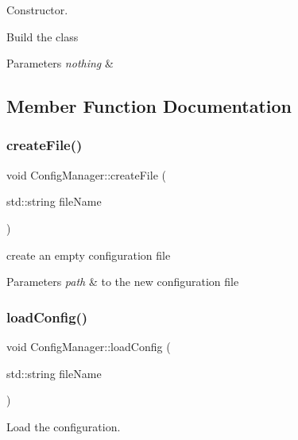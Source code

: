 Constructor. 

Build the class


\begin{DoxyParams}{Parameters}
{\em nothing} & \\
\hline
\end{DoxyParams}


\subsection{Member Function Documentation}
\mbox{\label{classConfigManager_a4f2b06f2ef741a15b3dfe82259cfd355}} 
\subsubsection{\texorpdfstring{create\+File()}{createFile()}}
{\footnotesize\ttfamily void Config\+Manager\+::create\+File (\begin{DoxyParamCaption}\item[{std\+::string}]{file\+Name }\end{DoxyParamCaption})}



create an empty configuration file 


\begin{DoxyParams}{Parameters}
{\em path} & to the new configuration file \\
\hline
\end{DoxyParams}
\mbox{\label{classConfigManager_a63ff6c831f037cf5bfe580b4944b0b6c}} 
\subsubsection{\texorpdfstring{load\+Config()}{loadConfig()}}
{\footnotesize\ttfamily void Config\+Manager\+::load\+Config (\begin{DoxyParamCaption}\item[{std\+::string}]{file\+Name }\end{DoxyParamCaption})}



Load the configuration. 


